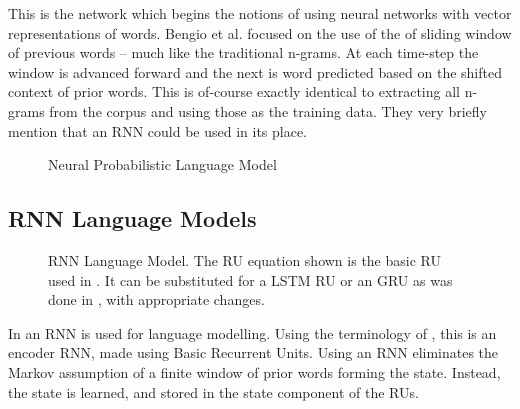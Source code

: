\documentclass[parskip]{komatufte}
\begin{document}
This is the network which begins the notions of using neural networks with vector representations of words.
Bengio et al. focused on the use of the of sliding window of previous words -- much like the traditional n-grams.
At each time-step the window is advanced forward and the next is word predicted based on the shifted context of prior words.
This is of-course exactly identical to extracting all n-grams from the corpus and using those as the training data.
They very briefly mention that an RNN could be used in its place.

\begin{figure}
	\caption{Neural Probabilistic Language Model}
	\label{fig:neural-language-model}
	\centering
	 
\end{figure}


\subsection{RNN Language Models}
\begin{figure}
	\caption{RNN Language Model. The RU equation shown is the basic RU used in \textcite{mikolov2010recurrent}.
	It can be substituted for a LSTM RU or an GRU as was done in \textcite{sundermeyer2012lstm,jozefowicz2015empirical}, with appropriate changes.
	}
	\label{fig:neural-language-model}
	\centering
	\resizebox{\textwidth}{!}{}
\end{figure}


In  an RNN is used for language modelling.
Using the terminology of , this is an encoder RNN, made using Basic Recurrent Units.
Using an RNN eliminates the Markov assumption of a finite window of prior words forming the state.
Instead, the state is learned, and stored in the state component of the RUs. 
\end{document}
